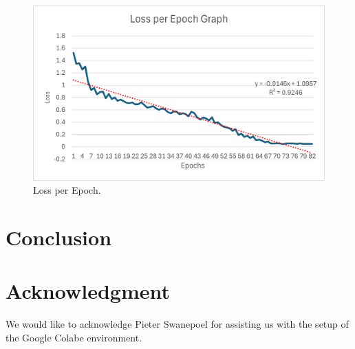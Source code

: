 \documentclass[conference]{IEEEtran}
\begin{document}
\begin{figure}[h]
    \centering
    \includegraphics[width=\linewidth]{Loss_per_Epoch_Graph.png}
    \caption{Loss per Epoch.}
    \label{fig 3}
\end{figure}

\section{Conclusion}

\section*{Acknowledgment}

We would like to acknowledge Pieter Swanepoel for assisting us with the setup of the Google Colabe environment.




\end{document}
